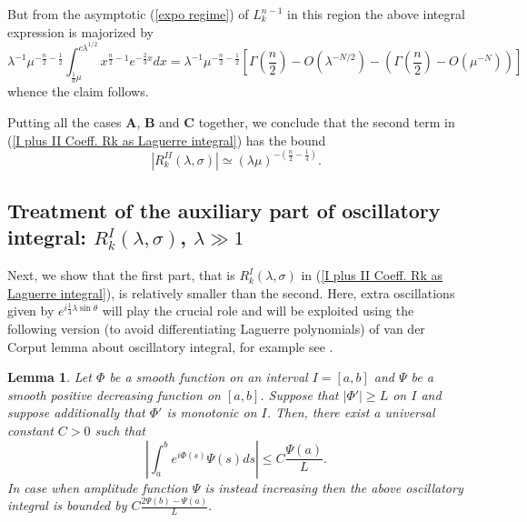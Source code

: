 \documentclass[11pt, reqno]{amsart}
\theoremstyle{plain}
\newtheorem{lemma}[theorem]{Lemma}
\theoremstyle{remark}
\theoremstyle{example}
\theoremstyle{definition}
\numberwithin{equation}{section}
\begin{document}
But from the asymptotic (\ref{expo regime}) of $L_{k}^{n-1}$ in this region the above integral expression is majorized by
\begin{equation*}
     \lambda^{-1} \mu^{-\frac{n}{2}-\frac{1}{2} } \int_{ \frac{1}{a}\mu }^{c \lambda^{1/2}}  x^{ \frac{n}{2} -1 } e^{- \frac{2}{3} x} dx =  \lambda^{-1} \mu^{-\frac{n}{2}-\frac{1}{2} } \left[ \Gamma( {\textstyle\frac{n}{2} } ) - O (\lambda^{-N/2}) - \left( \Gamma( {\textstyle\frac{n}{2} } ) - O (\mu^{-N}) \right) \right]
\end{equation*}
whence the claim follows.


Putting all the cases \textbf{A}, \textbf{B} and \textbf{C} together, we conclude that the second term in (\ref{I plus II Coeff. Rk as Laguerre integral}) has the bound
\begin{equation}
    |R_{k}^{II}(\lambda, \sigma)| \simeq (\lambda \mu )^{-\left( \frac{n}{2} - \frac{1}{4}  \right)}.
\end{equation}

\subsection*{Treatment of the auxiliary part of oscillatory integral: $R_{k}^{I}(\lambda, \sigma)$, $\lambda \gg 1$} Next, we show that the first part, that is $R_{k}^{I}(\lambda, \sigma)$ in (\ref{I plus II Coeff. Rk as Laguerre integral}), is relatively smaller than the second. Here, extra  oscillations given by $e^{i \frac{1}{4} \lambda \sin{\theta}}$ will play the crucial role and will be exploited using the following version (to avoid differentiating Laguerre polynomials) of van der Corput lemma about oscillatory integral, for example see  \cite[pp. 332-334]{Ste93}.

\begin{lemma}\label{Van der Corput}
    Let $\varPhi$ be a smooth function on an interval $I=[a, b]$ and $\varPsi$ be a smooth positive decreasing function on $[a, b]$. Suppose that $|\varPhi'| \geq L$ on $I$ and suppose additionally that $\varPhi'$ is monotonic on $I$. Then, there exist a universal constant $C>0$ such that
    \begin{equation*}
        \left|  \int_{a}^{b} e^{i \varPhi(s)} \varPsi(s)  ds \right| \leq C \frac{\varPsi(a)}{ L}.
    \end{equation*}
In case when amplitude function $\varPsi$ is instead increasing then the above oscillatory integral is bounded by $ C \frac{2 \varPsi(b) - \varPsi(a)}{ L}.$
\end{lemma}
\end{document}
